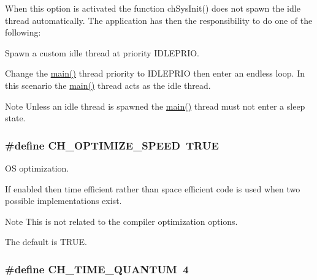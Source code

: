 When this option is activated the function {\ttfamily ch\+Sys\+Init()} does not spawn the idle thread automatically. The application has then the responsibility to do one of the following\+:
\begin{DoxyItemize}
\item Spawn a custom idle thread at priority {\ttfamily I\+D\+L\+E\+P\+R\+I\+O}.
\item Change the \hyperlink{main_8c_a840291bc02cba5474a4cb46a9b9566fe}{main()} thread priority to {\ttfamily I\+D\+L\+E\+P\+R\+I\+O} then enter an endless loop. In this scenario the {\ttfamily \hyperlink{main_8c_a840291bc02cba5474a4cb46a9b9566fe}{main()}} thread acts as the idle thread.
\end{DoxyItemize}\begin{DoxyNote}{Note}
Unless an idle thread is spawned the {\ttfamily \hyperlink{main_8c_a840291bc02cba5474a4cb46a9b9566fe}{main()}} thread must not enter a sleep state. 
\end{DoxyNote}
\hypertarget{group__config_gaa5a3d403206b04dfa43ee769e8a220c6}{}
\subsubsection[{C\+H\+\_\+\+O\+P\+T\+I\+M\+I\+Z\+E\+\_\+\+S\+P\+E\+E\+D}]{\setlength{\rightskip}{0pt plus 5cm}\#define C\+H\+\_\+\+O\+P\+T\+I\+M\+I\+Z\+E\+\_\+\+S\+P\+E\+E\+D~T\+R\+U\+E}\label{group__config_gaa5a3d403206b04dfa43ee769e8a220c6}


O\+S optimization. 

If enabled then time efficient rather than space efficient code is used when two possible implementations exist.

\begin{DoxyNote}{Note}
This is not related to the compiler optimization options. 

The default is {\ttfamily T\+R\+U\+E}. 
\end{DoxyNote}
\hypertarget{group__config_ga3c6800242611cf244a38c4a870e8515a}{}
\subsubsection[{C\+H\+\_\+\+T\+I\+M\+E\+\_\+\+Q\+U\+A\+N\+T\+U\+M}]{\setlength{\rightskip}{0pt plus 5cm}\#define C\+H\+\_\+\+T\+I\+M\+E\+\_\+\+Q\+U\+A\+N\+T\+U\+M~4}\label{group__config_ga3c6800242611cf244a38c4a870e8515a}


